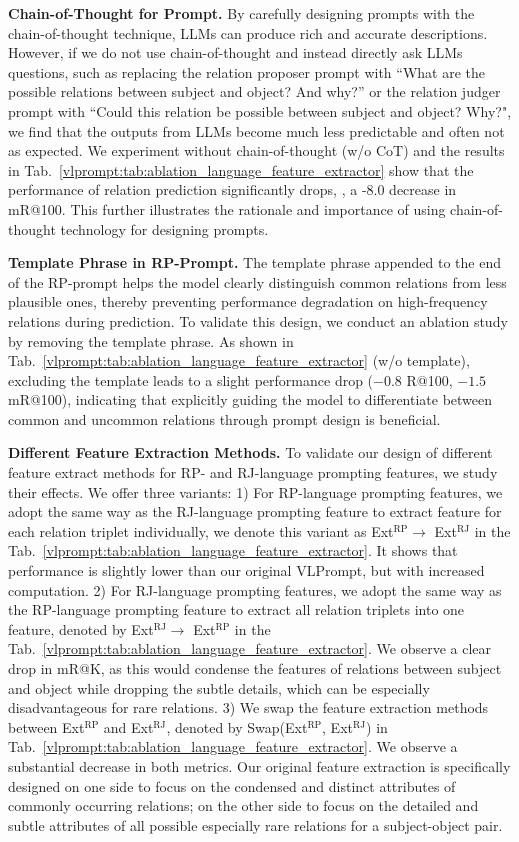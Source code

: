 \noindent \textbf{Chain-of-Thought for Prompt.}
By carefully designing prompts with the chain-of-thought technique, LLMs can produce rich and accurate descriptions.
However, if we do not use chain-of-thought and instead directly ask LLMs questions, such as replacing the relation proposer prompt with ``What are the possible relations between subject and object? And why?'' or the relation judger prompt with ``Could this relation be possible between subject and object? Why?", we find that the outputs from LLMs become much less predictable and often not as expected.
We experiment without chain-of-thought (w/o CoT) and the results in Tab.~\ref{vlprompt:tab:ablation_language_feature_extractor} show that the performance of relation prediction significantly drops, \ie, a -8.0 decrease in mR@100.
This further illustrates the rationale and importance of using chain-of-thought technology for designing prompts.

\noindent \textbf{Template Phrase in RP-Prompt.}
The template phrase appended to the end of the RP-prompt helps the model clearly distinguish common relations from less plausible ones, thereby preventing performance degradation on high-frequency relations during prediction.
To validate this design, we conduct an ablation study by removing the template phrase.
As shown in Tab.~\ref{vlprompt:tab:ablation_language_feature_extractor} (w/o template), excluding the template leads to a slight performance drop ($-0.8$ R@100, $-1.5$ mR@100), indicating that explicitly guiding the model to differentiate between common and uncommon relations through prompt design is beneficial.

\noindent \textbf{Different Feature Extraction Methods.}
To validate our design of different feature extract methods for RP- and RJ-language prompting features, we study their effects.
We offer three variants:
1) For RP-language prompting features, we adopt the same way as the RJ-language prompting feature to extract feature for each relation triplet individually, we denote this variant as Ext$^\text{RP} \rightarrow$ Ext$^\text{RJ}$ in the Tab.~\ref{vlprompt:tab:ablation_language_feature_extractor}.
It shows that performance is slightly lower than our original VLPrompt, but with increased computation.
2) For RJ-language prompting features, we adopt the same way as the RP-language prompting feature to extract all relation triplets into one feature, denoted by Ext$^\text{RJ} \rightarrow$ Ext$^\text{RP}$ in the Tab.~\ref{vlprompt:tab:ablation_language_feature_extractor}.
We observe a clear drop in mR@K, as this would condense the features of relations between subject and object while dropping the subtle details, which can be especially disadvantageous for rare relations.
3) We swap the feature extraction methods between Ext$^\text{RP}$ and Ext$^\text{RJ}$, denoted by Swap(Ext$^\text{RP}$, Ext$^\text{RJ}$) in Tab.~\ref{vlprompt:tab:ablation_language_feature_extractor}.
We observe a substantial decrease in both metrics.
Our original feature extraction is specifically designed on one side to focus on the condensed and distinct attributes of commonly occurring relations; on the other side to focus on the detailed and subtle attributes of all possible especially rare relations for a subject-object pair.

